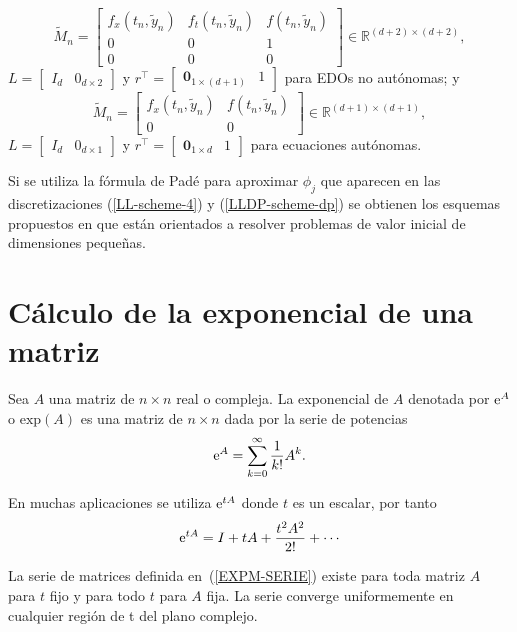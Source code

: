 \begin{equation*}
\widetilde{M}_{n}=\left[ 
\begin{array}{ccc}
f_{x}(t_{n},\widetilde{y}_{n}) &f%
_{t}(t_{n},\widetilde{y}_{n}) & f(t_{n},\widetilde{
		y}_{n}) \\ 
0 & 0 & 1 \\ 
0 & 0 & 0%
\end{array}%
\right] \in \mathbb{R}^{(d+2)\times (d+2)},
\end{equation*}%
$L=\left[ 
\begin{array}{ll}
I_{d} & 0_{d\times 2}%
\end{array}%
\right] $ y $r^{\intercal }=\left[ 
\begin{array}{ll}
\mathbf{0}_{1\times (d+1)} & 1%
\end{array}%
\right] $ para EDOs no autónomas; y 
\begin{equation*}
\widetilde{M}_{n}=\left[ 
\begin{array}{cc}
f_{x}(t_{n},\widetilde{y}_{n}) & f(t_{n},%
\widetilde{y}_{n}) \\ 
0 & 0%
\end{array}%
\right] \in \mathbb{R}^{(d+1)\times (d+1)},
\end{equation*}%
$L=\left[ 
\begin{array}{ll}
I_{d} & 0_{d\times 1}%
\end{array}%
\right] $ y $r^{\intercal }=\left[ 
\begin{array}{ll}
\mathbf{0}_{1\times d} & 1%
\end{array}%
\right] $ para ecuaciones autónomas.

Si se utiliza la fórmula de Padé para aproximar $\phi_j$ que aparecen en las discretizaciones (\ref{LL-scheme-4}) y (\ref{LLDP-scheme-dp}) se obtienen los esquemas propuestos en \cite{Jimenez13,Jimenez14AMC} que están orientados a resolver problemas de valor inicial de dimensiones pequeñas. 

\section{Cálculo de la exponencial de una matriz}

\begin{definition}
    \label{EXPM}\cite{golub2013matrix} Sea $A$ una matriz de $n\times n$ real o compleja. La exponencial de $A$ denotada por
    $ \mathrm{e}^{A} $ o $\mathrm{exp}(A)$ es una matriz de $n\times n$ dada por la serie de potencias
    \[\mathrm{e}^{A}=\sum_{k=0}^{\infty}\frac{1}{k!}A^{k}.\]
\end{definition}
En muchas aplicaciones se utiliza $\mathrm{e}^{tA}$ donde $t$ es un escalar, por tanto 
\begin{equation}
\me{tA}=I+tA+\frac{t^{2}A^{2}}{2!}+\cdots\label{EXPM-SERIE}
\end{equation}
\begin{theorem}\cite{IntroMatrix}
    La serie de matrices definida en~(\ref{EXPM-SERIE}) existe para toda matriz $A$ para $t$ fijo y
    para todo $t$ para $A$ fija. La serie converge uniformemente en cualquier región de t del plano complejo.
\end{theorem}

